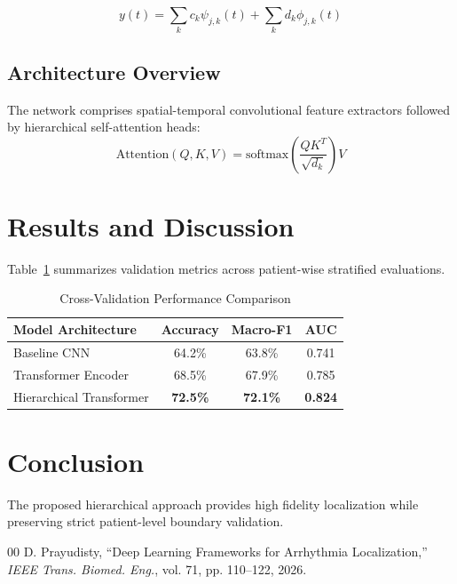 \documentclass[10pt,journal,compsoc]{IEEEtran}
\begin{document}
\begin{equation}
y(t) = \sum_{k} c_k \psi_{j,k}(t) + \sum_{k} d_k \phi_{j,k}(t)
\end{equation}

\subsection{Architecture Overview}
The network comprises spatial-temporal convolutional feature extractors followed by hierarchical self-attention heads:
\begin{equation}
\text{Attention}(Q, K, V) = \text{softmax}\left(\frac{QK^T}{\sqrt{d_k}}\right)V
\end{equation}

\section{Results and Discussion}
Table~\ref{tab:results} summarizes validation metrics across patient-wise stratified evaluations.

\begin{table}[h]
\caption{Cross-Validation Performance Comparison}
\label{tab:results}
\centering
\begin{tabular}{lccc}
\toprule
\textbf{Model Architecture} & \textbf{Accuracy} & \textbf{Macro-F1} & \textbf{AUC} \\ \midrule
Baseline CNN & 64.2\% & 63.8\% & 0.741 \\
Transformer Encoder & 68.5\% & 67.9\% & 0.785 \\
Hierarchical Transformer & \textbf{72.5\%} & \textbf{72.1\%} & \textbf{0.824} \\ \bottomrule
\end{tabular}
\end{table}

\section{Conclusion}
The proposed hierarchical approach provides high fidelity localization while preserving strict patient-level boundary validation.

\begin{thebibliography}{00}
 D. Prayudisty, ``Deep Learning Frameworks for Arrhythmia Localization,'' \emph{IEEE Trans. Biomed. Eng.}, vol. 71, pp. 110--122, 2026.
\end{thebibliography}
\end{document}
